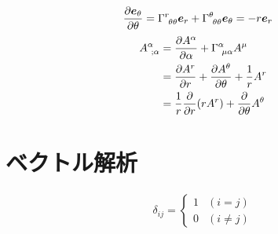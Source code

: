 \documentclass[uplatex,dvipdfmx,a4paper,11pt]{jlreq}
\newcommand{\ee}{\bm{e}}
\theoremstyle{definition}
\begin{document}
\begin{example}[極座標]
\begin{align}
    \diffp{\ee_\theta}{\theta} & = \Gamma^{r}_{\ \theta\theta}\ee_r + \Gamma^{\theta}_{\ \theta\theta}\ee_\theta = -r\ee_r
  \end{align}
  \begin{align}
    A^\alpha_{\ ;\alpha} & = \diffp{A^\alpha}{\alpha} + \Gamma^\alpha_{\ \mu\alpha}A^\mu \\
                         & = \diffp{A^r}{r} + \diffp{A^\theta}{\theta} + \frac{1}{r}A^r  \\
                         & = \frac{1}{r}\diffp{}{r}(rA^r) + \diffp{}{\theta}A^\theta
  \end{align}
\end{example}



\section{ベクトル解析}
\begin{definition}
  \begin{align}
    \delta_{ij} = \begin{cases}
                    1 & (i = j)    \\
                    0 & (i \neq j)
                  \end{cases}
  \end{align}
\end{definition}
\end{document}
